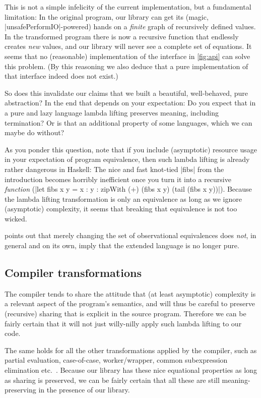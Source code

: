 \documentclass[manuscript,screen,acmsmall,nonacm]{acmart}
\begin{document}
This is not a simple infelicity of the current implementation, but a fundamental limitation: In the original program, our library can get its (magic, |unsafePerformIO|-powered) hands on a \emph{finite} graph of recursively defined values. In the transformed program there is now a recursive function that endlessly creates \emph{new} values, and our library will never see a complete set of equations. It seems that no (reasonable) implementation of the interface in \cref{fig:api} can solve this problem. (By this reasoning we also deduce that a pure implementation of that interface indeed does not exist.)

So does this invalidate our claims that we built a beautiful, well-behaved, pure abstraction? In the end that depends on your expectation: Do you expect that in a pure and lazy language lambda lifting preserves meaning, including termination? Or is that an additional property of some languages, which we can maybe do without?

As you ponder this question, note that if you include (asymptotic) resource usage in your expectation of program equivalence, then such lambda lifting is already rather dangerous in Haskell: The nice and fast knot-tied |fibs| from the introduction becomes horribly inefficient once you turn it into a recursive \emph{function} (|let fibs x y = x : y  : zipWith (+) (fibs x y) (tail (fibs x y))|). Because the lambda lifting transformation is only an equivalence as long as we ignore (asymptotic) complexity, it seems that breaking that equivalence is not too wicked.

 points out that merely changing the set of observational equivalences does \emph{not}, in general and on its own, imply that the extended language is no longer pure.

\subsection{Compiler transformations}\label{sec:comptrans}

The compiler tends to share the attitude that (at least asymptotic) complexity is a relevant aspect of the program's semantics, and will thus be careful to preserve (recursive) sharing that is explicit in the source program. Therefore we can be fairly certain that it will not just willy-nilly apply such lambda lifting to our code.

The same holds for all the other transformations applied by the compiler, such as partial evaluation, case-of-case, worker/wrapper, common subexpression elimination etc.\ \citep{optimiser}. Because our library has these nice equational properties as long as sharing is preserved, we can be fairly certain that all these are still meaning-preserving in the presence of our library.
\end{document}
